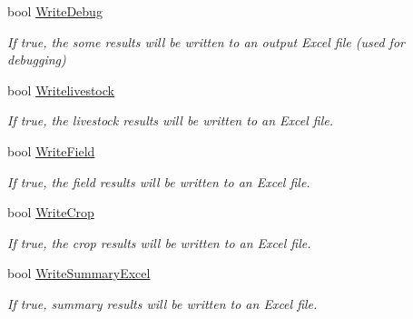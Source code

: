 \begin{DoxyCompactItemize}
\mbox{\label{class_global_vars_ab5e94b1f1db204716c7ce560fb63cfd7}} 
bool \mbox{\hyperlink{class_global_vars_ab5e94b1f1db204716c7ce560fb63cfd7}{Write\+Debug}}
\begin{DoxyCompactList}\small\item\em If true, the some results will be written to an output Excel file (used for debugging) \end{DoxyCompactList}\item 
\mbox{\label{class_global_vars_a1dc3e2876af71bd82de8365638c291ff}} 
bool \mbox{\hyperlink{class_global_vars_a1dc3e2876af71bd82de8365638c291ff}{Writelivestock}}
\begin{DoxyCompactList}\small\item\em If true, the livestock results will be written to an Excel file. \end{DoxyCompactList}\item 
\mbox{\label{class_global_vars_af83092827619cbb7ed64caf4daee213c}} 
bool \mbox{\hyperlink{class_global_vars_af83092827619cbb7ed64caf4daee213c}{Write\+Field}}
\begin{DoxyCompactList}\small\item\em If true, the field results will be written to an Excel file. \end{DoxyCompactList}\item 
\mbox{\label{class_global_vars_af07e4af0b4713de60efee52510ffa5ce}} 
bool \mbox{\hyperlink{class_global_vars_af07e4af0b4713de60efee52510ffa5ce}{Write\+Crop}}
\begin{DoxyCompactList}\small\item\em If true, the crop results will be written to an Excel file. \end{DoxyCompactList}\item 
\mbox{\label{class_global_vars_acc134ab3675bd4d699ae33e0469b46f5}} 
bool \mbox{\hyperlink{class_global_vars_acc134ab3675bd4d699ae33e0469b46f5}{Write\+Summary\+Excel}}
\begin{DoxyCompactList}\small\item\em If true, summary results will be written to an Excel file. \end{DoxyCompactList}\item 
\mbox{\label{class_global_vars_a9b407972734f633b8f613181750a9c6a}} 

\end{DoxyCompactItemize}
